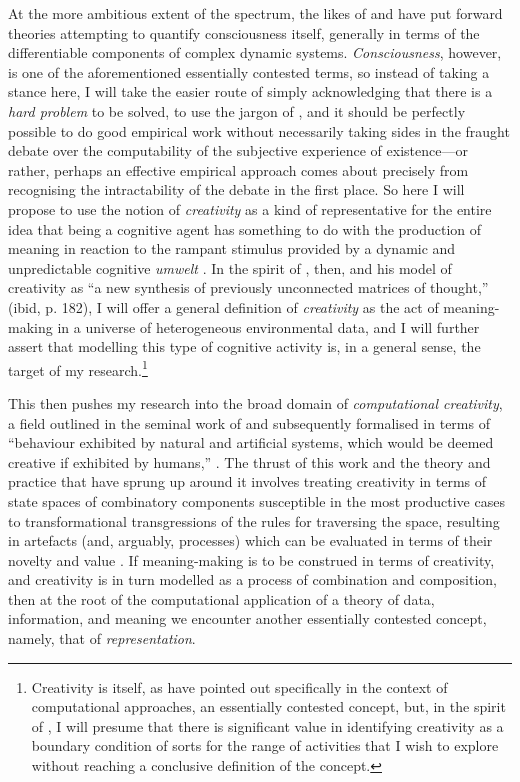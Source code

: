 At the more ambitious extent of the spectrum, the likes of \cite{Koch2004} and \cite{Tononi2008} have put forward theories attempting to quantify consciousness itself, generally in terms of the differentiable components of complex dynamic systems.  \emph{Consciousness}, however, is one of the aforementioned essentially contested terms, so instead of taking a stance here, I will take the easier route of simply acknowledging that there is a \emph{hard problem} to be solved, to use the jargon of \cite{Chalmers1996}, and it should be perfectly possible to do good empirical work without necessarily taking sides in the fraught debate over the computability of the subjective experience of existence---or rather, perhaps an effective empirical approach comes about precisely from recognising the intractability of the debate in the first place.  So here I will propose to use the notion of \emph{creativity} as a kind of representative for the entire idea that being a cognitive agent has something to do with the production of meaning in reaction to the rampant stimulus provided by a dynamic and unpredictable cognitive \emph{umwelt} \citep{VonUexkull1957}.  In the spirit of \cite{Koestler1964}, then, and his model of creativity as ``a new synthesis of previously unconnected matrices of thought,'' (ibid, p. 182), I will offer a general definition of \emph{creativity} as the act of meaning-making in a universe of heterogeneous environmental data, and I will further assert that modelling this type of cognitive activity is, in a general sense, the target of my research.\footnote{Creativity is itself, as \cite{ColtonEA2014} have pointed out specifically in the context of computational approaches, an essentially contested concept, but, in the spirit of \cite{Gallie1956}, I will presume that there is significant value in identifying creativity as a boundary condition of sorts for the range of activities that I wish to explore without reaching a conclusive definition of the concept.}

This then pushes my research into the broad domain of \emph{computational creativity}, a field outlined in the seminal work of \cite{Boden1990} and subsequently formalised in terms of ``behaviour  exhibited  by  natural  and artificial systems, which would be deemed creative if exhibited by humans,'' \citep[][p. 206]{Wiggins2006b}.  The thrust of this work and the theory and practice that have sprung up around it involves treating creativity in terms of state spaces of combinatory components susceptible in the most productive cases to transformational transgressions of the rules for traversing the space, resulting in artefacts (and, arguably, processes) which can be evaluated in terms of their novelty and value \citep[see][among others, for interesting theoretical work on the evaluation of computational creativity]{Ritchie2007,Colton2008,Jordanous2012}.  If meaning-making is to be construed in terms of creativity, and creativity is in turn modelled as a process of combination and composition, then at the root of the computational application of a theory of data, information, and meaning we encounter another essentially contested concept, namely, that of \emph{representation}.

